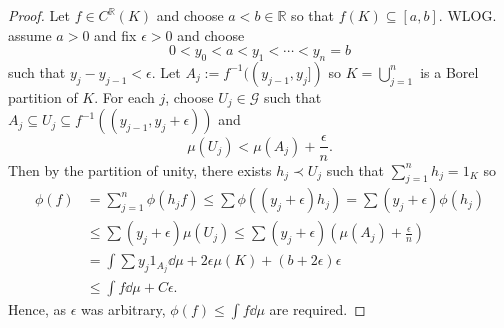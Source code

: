 \documentclass[]{article}
\theoremstyle{definition}
\begin{document}
\begin{proof}
  Let \(f \in C^\mathbb{R}(K)\) and choose \(a < b \in \mathbb{R}\) so that \(f(K) \subseteq [a, b]\). 
  WLOG. assume \(a > 0\) and fix \(\epsilon > 0\) and choose 
  \[0 < y_0 < a < y_1 < \cdots < y_n = b\]
  such that \(y_j - y_{j - 1} < \epsilon\). Let \(A_j := f^{-1}((y_{j - 1}, y_j])\) so 
  \(K = \bigcup_{j = 1}^n\) is a Borel partition of \(K\). For each \(j\), choose \(U_j \in \mathcal{G}\) 
  such that \(A_j \subseteq U_j \subseteq f^{-1}((y_{j - 1}, y_j + \epsilon))\) and 
  \[\mu(U_j) < \mu(A_j) + \frac{\epsilon}{n}.\]
  Then by the partition of unity, there exists \(h_j \prec U_j\) such that \(\sum_{j = 1}^n h_j = 1_K\) 
  so
  \begin{align*}
    \phi(f) & = \sum_{j = 1}^n \phi(h_j f) \le \sum \phi((y_j + \epsilon) h_j) = \sum (y_j + \epsilon)\phi(h_j)\\
      & \le \sum (y_j + \epsilon)\mu(U_j) \le \sum (y_j + \epsilon)\left(\mu(A_j) + \frac{\epsilon}{n}\right)\\
      & = \int \sum y_j 1_{A_j} \dd\mu + 2 \epsilon \mu(K) + (b + 2\epsilon)\epsilon\\
      & \le \int f \dd \mu + C \epsilon.
  \end{align*} 
  Hence, as \(\epsilon\) was arbitrary, \(\phi(f) \le \int f \dd \mu\) are required.
\end{proof}
\end{document}
